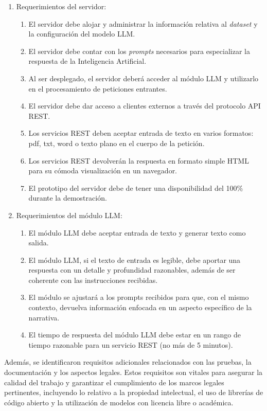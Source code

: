 \begin{enumerate}
	\item Requerimientos del servidor:
	      \begin{enumerate}
		      \item El servidor debe alojar y administrar la información relativa al \textit{dataset} y la configuración del modelo LLM.
		      \item El servidor debe contar con los \textit{prompts} necesarios para especializar la respuesta de  la Inteligencia Artificial.
		      \item Al ser desplegado, el servidor deberá acceder al módulo LLM y utilizarlo en el procesamiento de peticiones entrantes.
		      \item El servidor debe dar acceso a clientes externos a través del protocolo API REST.
		      \item Los servicios REST deben aceptar entrada de texto en varios formatos: pdf, txt, word o texto plano en el cuerpo de la petición.
		      \item Los servicios REST devolverán la respuesta en formato simple HTML para su cómoda visualización en un navegador.
		      \item El prototipo del servidor debe de tener una disponibilidad del 100\% durante la demostración.
	      \end{enumerate}
	\item Requerimientos del módulo LLM:
	      \begin{enumerate}
		      \item El módulo LLM debe aceptar entrada de texto y generar texto como salida.
		      \item El módulo LLM, si el texto de entrada es legible, debe aportar una respuesta con un detalle y profundidad razonables,
		            además de ser coherente con las instrucciones recibidas.
		      \item El módulo se ajustará a los prompts recibidos para que, con el mismo contexto,
			  		devuelva información enfocada en un aspecto específico de la narrativa.
		      \item El tiempo de respuesta del módulo LLM debe estar en un rango de tiempo razonable para un servicio REST (no más de 5 minutos).
	      \end{enumerate}
\end{enumerate}

Además, se identificaron requisitos adicionales relacionados con las pruebas,
la documentación y los aspectos legales. 
Estos requisitos son vitales para asegurar la calidad del trabajo 
y garantizar el cumplimiento de los marcos legales pertinentes, 
incluyendo lo relativo a la propiedad intelectual, el uso de librerías de código abierto 
y la utilización de modelos con licencia libre o académica.

